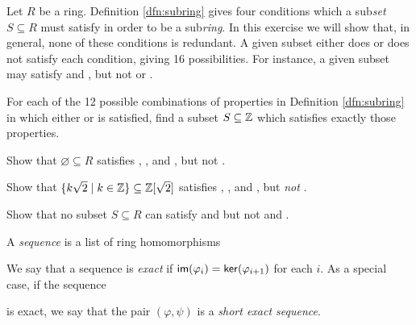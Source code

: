 \begin{exercise}
Let \(R\) be a ring.
Definition \ref{dfn:subring} gives four conditions which a sub\emph{set} \(S \subseteq R\) must satisfy in order to be a sub\emph{ring}.
In this exercise we will show that, in general, none of these conditions is redundant.
A given subset either does or does not satisfy each condition, giving 16 possibilities.
For instance, a given subset may satisfy  and , but not  or .
\begin{proplist}
\item For each of the 12 possible combinations of properties in Definition \ref{dfn:subring} in which either  or  is  satisfied, find a subset \(S \subseteq \mathbb{Z}\) which satisfies exactly those properties.
\item Show that \(\varnothing \subseteq R\) satisfies , , and , but not .
\item Show that \(\{ k\sqrt{2} \mid k \in \mathbb{Z} \} \subseteq \mathbb{Z}[\sqrt{2}]\) satisfies , , and , but \emph{not} .
\item Show that no subset \(S \subseteq R\) can satisfy  and  but not  and .
\end{proplist}
\end{exercise}

\begin{dfn}
A \emph{sequence} is a list of ring homomorphisms
\begin{center}
\end{center}
We say that a sequence is \emph{exact} if \( \mathsf{im}(\varphi_i)  =  \mathsf{ker}(\varphi_{i+1}) \) for each \(i\).
As a special case, if the sequence
\begin{center}
\end{center}
is exact, we say that the pair \((\varphi, \psi)\) is a \emph{short exact sequence}.
\end{dfn}

